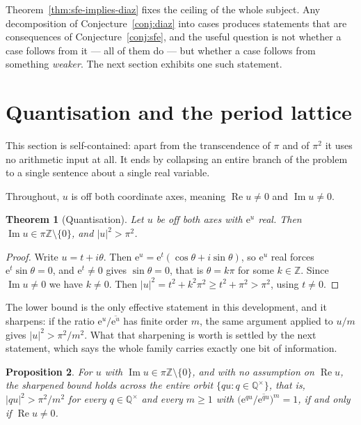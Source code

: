\documentclass[11pt,a4paper]{article}
\theoremstyle{plain}
\newtheorem{theorem}{Theorem}[section]
\newtheorem{proposition}[theorem]{Proposition}
\theoremstyle{definition}
\newcommand{\e}{\mathrm{e}}
\newcommand{\Q}{\mathbb{Q}}
\newcommand{\Z}{\mathbb{Z}}
\begin{document}
Theorem~\ref{thm:sfe-implies-diaz} fixes the ceiling of the whole subject. Any decomposition of
Conjecture~\ref{conj:diaz} into cases produces statements that are consequences of
Conjecture~\ref{conj:sfe}, and the useful question is not whether a case follows from it --- all
of them do --- but whether a case follows from something \emph{weaker}. The next section
exhibits one such statement.


\section{Quantisation and the period lattice}\label{sec:quant}

This section is self-contained: apart from the transcendence of $\pi$ and of $\pi^{2}$ it uses
no arithmetic input at all. It ends by collapsing an entire branch of the problem to a single
sentence about a single real variable.

Throughout, $u$ is off both coordinate axes, meaning $\operatorname{Re}u\neq0$ and
$\operatorname{Im}u\neq0$.

\begin{theorem}[Quantisation]\label{thm:quant}
Let $u$ be off both axes with $\e^{u}$ real. Then $\operatorname{Im}u\in\pi\Z\setminus\{0\}$,
and $\lvert u\rvert^{2}>\pi^{2}$.
\end{theorem}

\begin{proof}
Write $u=t+i\theta$. Then $\e^{u}=\e^{t}(\cos\theta+i\sin\theta)$, so $\e^{u}$ real forces
$\e^{t}\sin\theta=0$, and $\e^{t}\neq0$ gives $\sin\theta=0$, that is $\theta=k\pi$ for some
$k\in\Z$. Since $\operatorname{Im}u\neq0$ we have $k\neq0$. Then
$\lvert u\rvert^{2}=t^{2}+k^{2}\pi^{2}\geq t^{2}+\pi^{2}>\pi^{2}$, using $t\neq0$.
\end{proof}

The lower bound is the only effective statement in this development, and it sharpens: if the
ratio $\e^{u}/\overline{\e^{u}}$ has finite order $m$, the same argument applied to $u/m$ gives
$\lvert u\rvert^{2}>\pi^{2}/m^{2}$. What that sharpening is worth is settled by the next
statement, which says the whole family carries exactly one bit of information.

\begin{proposition}\label{prop:quant-orbit}
For $u$ with $\operatorname{Im}u\in\pi\Z\setminus\{0\}$, and with no assumption on $\operatorname{Re}u$,
the sharpened bound holds across the entire orbit $\{qu: q\in\Q^{\times}\}$, that is,
$\lvert qu\rvert^{2}>\pi^{2}/m^{2}$ for every $q\in\Q^{\times}$ and every $m\ge1$ with
$\bigl(\e^{qu}/\overline{\e^{qu}}\bigr)^{m}=1$, if and only if $\operatorname{Re}u\neq0$.
\end{proposition}
\end{document}
